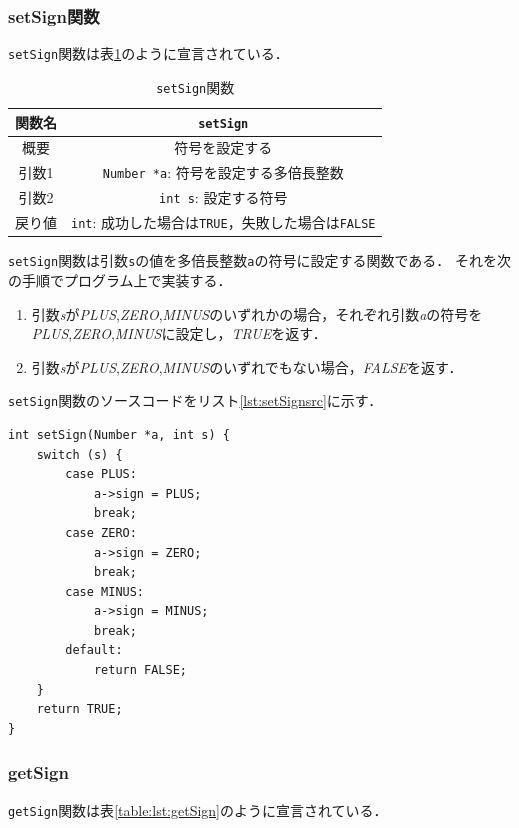 \documentclass[a4paper,11pt,dvipdfmx]{jsarticle}
\begin{document}
\subsubsection{setSign関数}
\texttt{setSign}関数は表\ref{table:lst:setSign}のように宣言されている．

\begin{table}[H]
\centering
\caption{\texttt{setSign}関数}
\label{table:lst:setSign}
\begin{tabular}{c||c}
\hline
関数名    & \texttt{setSign}   \\
\hline
概要    & 符号を設定する   \\
\hline
引数1    & \texttt{Number *a}: 符号を設定する多倍長整数     \\
引数2    & \texttt{int s}: 設定する符号   \\
\hline
戻り値    & \texttt{int}: 成功した場合は\texttt{TRUE}，失敗した場合は\texttt{FALSE}   \\
\hline
\end{tabular}
\end{table}

\texttt{setSign}関数は引数\texttt{s}の値を多倍長整数\texttt{a}の符号に設定する関数である．
それを次の手順でプログラム上で実装する．
\begin{enumerate}
  \item 引数\textit{s}が\textit{PLUS},\textit{ZERO},\textit{MINUS}のいずれかの場合，それぞれ引数\textit{a}の符号を\textit{PLUS},\textit{ZERO},\textit{MINUS}に設定し，\textit{TRUE}を返す．
  \item 引数\textit{s}が\textit{PLUS},\textit{ZERO},\textit{MINUS}のいずれでもない場合，\textit{FALSE}を返す．
\end{enumerate}

\texttt{setSign}関数のソースコードをリスト\ref{lst:setSignsrc}に示す．
\begin{lstlisting}[caption=\texttt{setSign関数},label=lst:setSignsrc]
  int setSign(Number *a, int s) {
    switch (s) {
        case PLUS:
            a->sign = PLUS;
            break;
        case ZERO:
            a->sign = ZERO;
            break;
        case MINUS:
            a->sign = MINUS;
            break;
        default:
            return FALSE;
    }
    return TRUE;
}
\end{lstlisting}

\subsubsection{getSign}
\texttt{getSign}関数は表\ref{table:lst:getSign}のように宣言されている．
\end{document}
